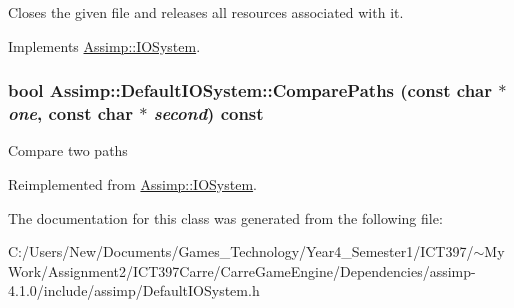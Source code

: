 Closes the given file and releases all resources associated with it. 

Implements \hyperlink{class_assimp_1_1_i_o_system_8c334d60f04bceeb6bd0157d21723f3e}{Assimp::IOSystem}.\hypertarget{class_assimp_1_1_default_i_o_system_0eb1be0b288bdad621f9036bd5290fe7}{
\subsubsection[ComparePaths]{\setlength{\rightskip}{0pt plus 5cm}bool Assimp::DefaultIOSystem::ComparePaths (const char $\ast$ {\em one}, \/  const char $\ast$ {\em second}) const}}
\label{class_assimp_1_1_default_i_o_system_0eb1be0b288bdad621f9036bd5290fe7}


Compare two paths 

Reimplemented from \hyperlink{class_assimp_1_1_i_o_system_11349a65b353ed62f655c3dd802b9062}{Assimp::IOSystem}.

The documentation for this class was generated from the following file:\begin{CompactItemize}
\item 
C:/Users/New/Documents/Games\_\-Technology/Year4\_\-Semester1/ICT397/$\sim$My Work/Assignment2/ICT397Carre/CarreGameEngine/Dependencies/assimp-4.1.0/include/assimp/DefaultIOSystem.h\end{CompactItemize}
